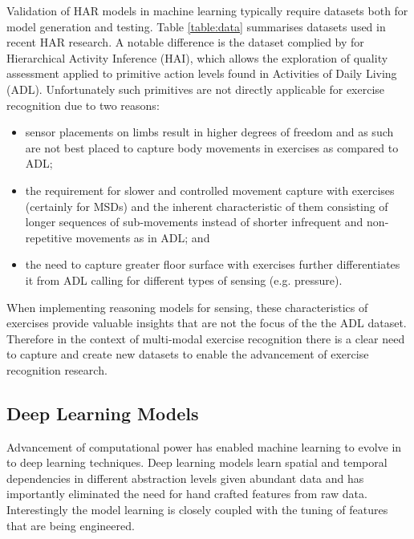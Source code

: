 Validation of HAR models in machine learning typically require datasets both for model generation and testing. Table \ref{table:data} summarises datasets used in recent HAR research. 
A notable difference is the dataset complied by  for Hierarchical Activity Inference (HAI), which allows the exploration of quality assessment applied to primitive action levels found in Activities of Daily Living (ADL). 
Unfortunately such primitives are not directly applicable for exercise recognition due to two reasons:
\begin{itemize}
\item sensor placements on limbs result in higher degrees of freedom and as such are not best placed to capture body movements in exercises as compared to ADL; 
\item the requirement for slower and controlled movement capture with exercises (certainly for MSDs) 
and the inherent characteristic of them consisting of longer sequences of sub-movements instead of shorter infrequent and non-repetitive movements as in ADL; and  
\item the need to capture greater floor surface with exercises further differentiates it from ADL calling for different types of sensing (e.g. pressure).  
\end{itemize}
When implementing reasoning models for sensing, these characteristics of exercises provide valuable insights that are not the focus of the the ADL dataset. Therefore in the context of multi-modal exercise recognition there is a clear need to capture and create new datasets to enable the advancement of exercise recognition research. 

\subsection{Deep Learning Models}
Advancement of computational power has enabled machine learning to evolve in to deep learning techniques. Deep learning models learn spatial and temporal dependencies in different abstraction levels given abundant data and has importantly eliminated the need for hand crafted features from raw data. Interestingly the model learning is closely coupled with the tuning of features that are being engineered. 

